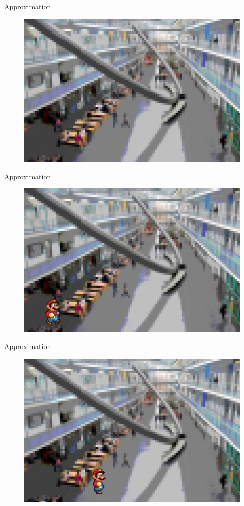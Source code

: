 \documentclass[9pt,pdftex]{beamer}
\begin{document}
\begin{frame}{Approximation}
\begin{figure}
\includegraphics[width=0.8\linewidth]{MI_slides_verylow}
\end{figure}
\end{frame}

\begin{frame}{Approximation}
\begin{figure}
\includegraphics[width=0.8\linewidth]{MI_slides_mario_f1}
\end{figure}
\end{frame}

\begin{frame}{Approximation}
\begin{figure}
\includegraphics[width=0.8\linewidth]{MI_slides_mario_f2}
\addtocounter{framenumber}{-1}
\end{figure}
\end{frame}
\end{document}
